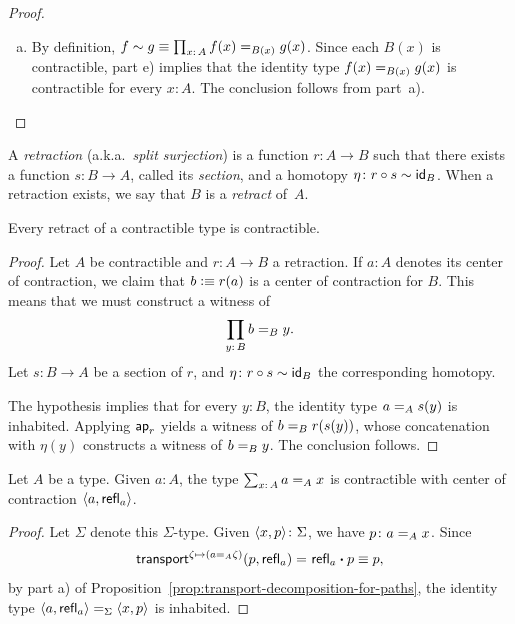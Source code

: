 \begin{proof}
\begin{enumerate}[a),font=\upshape]
        \item By definition, $f\sim g\equiv\prod_{x\colon A}f(x)\eq{B(x)}g(x)$. Since each $B(x)$ is contractible, part e) implies that the identity type $f(x)\mathrel{=_{B(x)}}g(x)$ is contractible for every $x\colon A$. The conclusion follows from part~a). 
    \end{enumerate}
\end{proof}

\begin{defn}\label{defn:type-retract}
    A \textsl{retraction} (a.k.a.~\textsl{split surjection}) is a function $r\colon A\to B$ such that there exists a function $s\colon B\to A$, called its \textsl{section}, and a homotopy $\eta\colon r\circ s\sim\id_B$. When a retraction exists, we say that $B$ is a \textsl{retract} of~$A$.
\end{defn}

\begin{prop}\label{prop:contractible-retracts}
    Every retract of a contractible type is contractible.
\end{prop}

\begin{proof}
    Let\/ $A$ be contractible and\/ $r\colon A\to B$ a retraction. If\/ $a\colon A$ denotes its center of contraction, we claim that\/ $b\mathrel{\vcentcolon}\equiv r(a)$ is a center of contraction for\/ $B$. This means that we must construct a witness of
    \[
        \prod_{y\colon B}b\eq By.
    \]
    Let\/ $s\colon B\to A$ be a section of\/ $r$, and\/ $\eta\colon r\circ s\sim\id_B$ the corresponding homotopy.

    The hypothesis implies that for every\/ $y\colon B$, the identity type\/ $a\mathrel{=_{A}}s(y)$ is inhabited. Applying\/ $\mathsf{ap}_r$ yields a witness of\/ $b\mathrel{=_{B}}r(s(y))$, whose concatenation with\/ $\eta(y)$ constructs a witness of\/ $b\mathrel{=_{B}}y$. The conclusion follows.
    
\end{proof}

\begin{lem}\label{lem:Sigma-identity-is-contractible}
    Let\/ $A$ be a type. Given\/ $a\colon A$, the type\/ $\sum_{x\colon A}a\eq Ax$ is contractible with center of contraction\/ $\langle a,\mathsf{refl}_a\rangle$.
\end{lem}

\begin{proof}
    Let $\Sigma$ denote this $\Sigma$-type. Given $\dep{x,p}\colon\Sigma$, we have $p\colon a\eq Ax$. Since
    \[
        \mathsf{transport}^{\zeta\mapsto(a\mathrel{=_{A}}\zeta)}(p,\mathsf{refl}_a)
            \mathrel{=_{}}\mathsf{refl}_a\mathbin{\boldsymbol{\cdot}} p\equiv p,
    \]
    by part a) of Proposition~\ref{prop:transport-decomposition-for-paths}, the identity type $\langle a,\mathsf{refl}_a\rangle\mathrel{=_{\Sigma}}\langle x,p\rangle$ is inhabited.
\end{proof}

